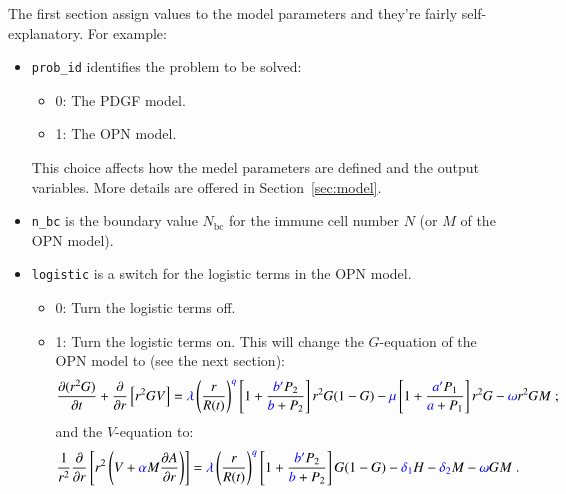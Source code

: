 \documentclass{amsproc}
\theoremstyle{definition}
\theoremstyle{remark}
\numberwithin{equation}{section}
\numberwithin{figure}{section}
\newcommand{\po}[1]{\frac{\partial}{\partial{#1}}}
\newcommand{\pp}[2]{\frac{\partial {#1}}{\partial {#2}}}
\begin{document}
The first section assign values to the model parameters and they're fairly self-explanatory.
For example:
\begin{itemize}
\item \texttt{prob\_id} identifies the problem to be solved:
  \begin{itemize}
    \item 0: The PDGF model.
    \item 1: The OPN model.
  \end{itemize}
  This choice affects how the medel parameters are defined and the output variables.
  More details are offered in Section~\ref{sec:model}.
\item \texttt{n\_bc} is the boundary value $N_{\textrm{bc}}$ for the immune cell number $N$ (or $M$ of the OPN model).
\item \texttt{logistic} is a switch for the logistic terms in the OPN model.
  \begin{itemize}
    \item 0: Turn the logistic terms off.
    \item 1: Turn the logistic terms on. 
      This will change the $G$-equation of the OPN model to (see the next section):
      \begin{displaymath}
        \pp{(r^2G)}{t} + \po{r}\left[r^2 G V\right] = {\color{blue}\lambda}\left(\frac{r}{R(t)}\right)^{\color{blue}q}\left[1+\frac{{\color{blue}b'}P_2}{{\color{blue}b}+P_2}\right]r^2G(1-G) - {\color{blue}\mu}\left[1+\frac{{\color{blue}a'}P_1}{{\color{blue}a}+P_1}\right]r^2G - {\color{blue}\omega}r^2GM\;;
      \end{displaymath}
      and 
      the $V$-equation to:
      \begin{displaymath}
        \frac{1}{r^2}\po{r}\left[r^2\left(V+{\color{blue}\alpha} M\pp{A}{r}\right)\right] = {\color{blue}\lambda}\left(\frac{r}{R(t)}\right)^{\color{blue}q}\left[1+\frac{{\color{blue}b'}P_2}{{\color{blue}b}+P_2}\right] G(1-G) - {\color{blue}\delta_1} H - {\color{blue}\delta_2} M - {\color{blue}\omega}GM\;.
      \end{displaymath}
  \end{itemize}
\end{itemize}
\end{document}
